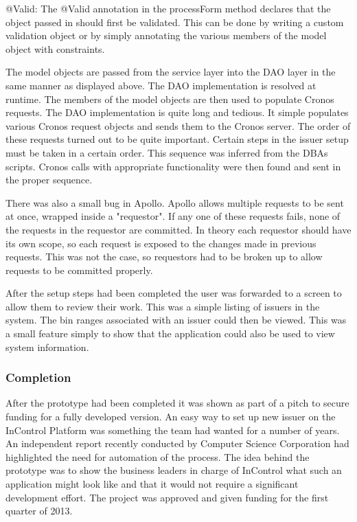 \documentclass[a4paper, 11pt, titlepage]{article}
\begin{document}
@Valid: The @Valid annotation in the processForm method declares that the object passed in should first be validated. This can be done by writing a custom validation object or by simply annotating the various members of the model object with constraints.  
 
The model objects are passed from the service layer into the DAO layer in the same manner as displayed above. The DAO implementation is resolved at runtime. The members of the model objects are then used to populate Cronos requests. The DAO implementation is quite long and tedious. It simple populates various Cronos request objects and sends them to the Cronos server. The order of these requests turned out to be quite important. Certain steps in the issuer setup must be taken in a certain order. This sequence was inferred from the DBAs scripts. Cronos calls with appropriate functionality were then found and sent in the proper sequence.  
 
There was also a small bug in Apollo. Apollo allows multiple requests to be sent at once, wrapped inside a "requestor". If any one of these requests fails, none of the requests in the requestor are committed. In theory each requestor should have its own scope, so each request is exposed to the changes made in previous requests. This was not the case, so requestors had to be broken up to allow requests to be committed properly. 
 
After the setup steps had been completed the user was forwarded to a screen to allow them to review their work. This was a simple listing of issuers in the system. The bin ranges associated with an issuer could then be viewed. This was a small feature simply to show that the application could also be used to view system information. 
 
\subsubsection{Completion} 
 
After the prototype had been completed it was shown as part of a pitch to secure funding for a fully developed version. An easy way to set up new issuer on the InControl Platform was something the team had wanted for a number of years. An independent report recently conducted by Computer Science Corporation had highlighted the need for automation of the process. The idea behind the prototype was to show the business leaders in charge of InControl what such an application might look like and that it would not require a significant development effort. The project was approved and given funding for the first quarter of 2013.  
 
\end{document}
